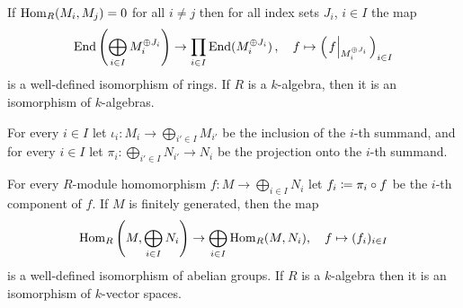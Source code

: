 

\begin{corollary}
  \label{corollary: decomposition of endomorphism ring into product including sums}
  If $\operatorname{Hom}_R(M_i, M_j) = 0$ for all $i \neq j$ then for all index sets $J_i$, $i \in I$ the map
  \[
            \End\left( \bigoplus_{i \in I} M_i^{\oplus J_i} \right)
    \to     \prod_{i \in I} \End( M_i^{\oplus J_i} ) \,,
    \quad   f
    \mapsto \left( \restrict*{f}{M_i^{\oplus J_i}} \right)_{i \in I}
  \]
  is a well-defined isomorphism of rings.
  If $R$ is a $k$-algebra, then it is an isomorphism of $k$-algebras.
\end{corollary}




\begin{fluff}
  For every $i \in I$ let $\iota_i \colon M_i \to \bigoplus_{i' \in I} M_{i'}$ be the inclusion of the $i$-th summand, and for every $i \in I$ let $\pi_i \colon \bigoplus_{i' \in I} N_{i'} \to N_i$ be the projection onto the $i$-th summand.
\end{fluff}


\begin{lemma}
  \label{lemma: hom is additive for fg modules}
  For every $R$-module homomorphism $f \colon M \to \bigoplus_{i \in I} N_i$ let $f_i \coloneqq \pi_i \circ f$ be the $i$-th component of $f$.
  If $M$ is finitely generated, then the map
  \[
            \operatorname{Hom}_R\left( M, \bigoplus_{i \in I} N_i \right)
    \to     \bigoplus_{i \in I} \operatorname{Hom}_R(M, N_i),
    \quad   f
    \mapsto (f_i)_{i \in I}
  \]
  is a well-defined isomorphism of abelian groups.
  If $R$ is a $k$-algebra then it is an isomorphism of $k$-vector spaces.
\end{lemma}




